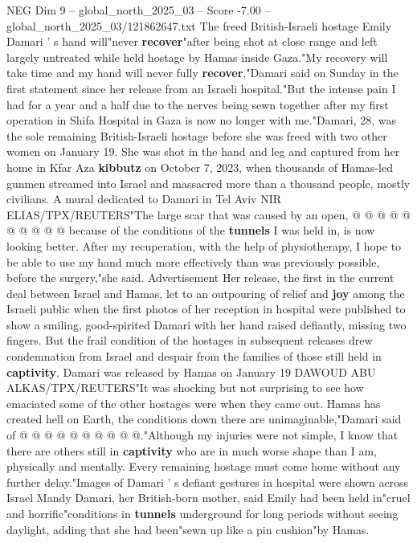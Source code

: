 \begin{textsample}{NEG Dim 9 – global\_north\_2025\_03 – Score -7.00 – global\_north\_2025\_03/121862647.txt}  \label{ex:f9_neg_147}
The freed British-Israeli hostage Emily Damari ' s hand will"never \textbf{recover}"after being shot at close range and left largely untreated while held hostage by Hamas inside Gaza."My recovery will take time and my hand will never fully \textbf{recover},"Damari said on Sunday in the first statement since her release from an Israeli hospital."But the intense pain I had for a year and a half due to the nerves being sewn together after my first operation in Shifa Hospital in Gaza is now no longer with me."Damari, 28, was the sole remaining British-Israeli hostage before she was freed with two other women on January 19.
She was shot in the hand and leg and captured from her home in Kfar Aza \textbf{kibbutz} on October 7, 2023, when thousands of Hamas-led gunmen streamed into Israel and massacred more than a thousand people, mostly civilians.
A mural dedicated to Damari in Tel Aviv NIR ELIAS/TPX/REUTERS"The large scar that was caused by an open, @ @ @ @ @ @ @ @ @ @ because of the conditions of the \textbf{tunnels} I was held in, is now looking better.
After my recuperation, with the help of physiotherapy, I hope to be able to use my hand much more effectively than was previously possible, before the surgery,"she said.
Advertisement Her release, the first in the current deal between Israel and Hamas, let to an outpouring of relief and \textbf{joy} among the Israeli public when the first photos of her reception in hospital were published to show a smiling, good-spirited Damari with her hand raised defiantly, missing two fingers.
But the frail condition of the hostages in subsequent releases drew condemnation from Israel and despair from the families of those still held in \textbf{captivity}.
Damari was released by Hamas on January 19 DAWOUD ABU ALKAS/TPX/REUTERS"It was shocking but not surprising to see how emaciated some of the other hostages were when they came out.
Hamas has created hell on Earth, the conditions down there are unimaginable,"Damari said of @ @ @ @ @ @ @ @ @ @."Although my injuries were not simple, I know that there are others still in \textbf{captivity} who are in much worse shape than I am, physically and mentally.
Every remaining hostage must come home without any further delay."Images of Damari ' s defiant gestures in hospital were shown across Israel Mandy Damari, her British-born mother, said Emily had been held in"cruel and horrific"conditions in \textbf{tunnels} underground for long periods without seeing daylight, adding that she had been"sewn up like a pin cushion"by Hamas.

\end{textsample}
